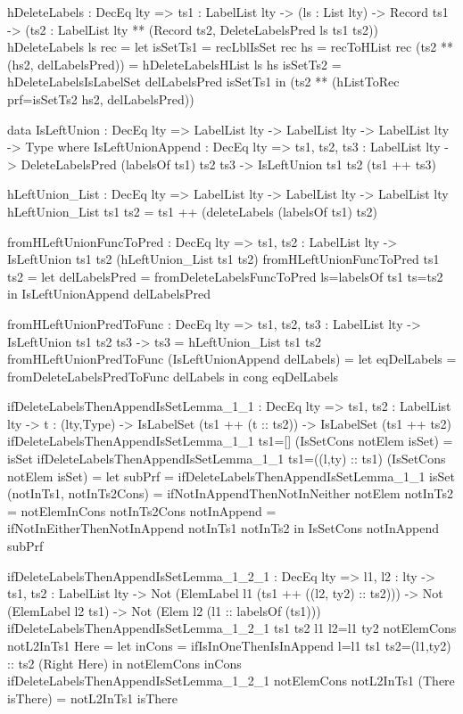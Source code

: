 \begin{code}
hDeleteLabels : DecEq lty => {ts1 : LabelList lty} -> 
  (ls : List lty) -> Record ts1 ->
  (ts2 : LabelList lty ** (Record ts2, DeleteLabelsPred ls ts1 ts2))
hDeleteLabels ls rec =
  let
    isSetTs1 = recLblIsSet rec
    hs = recToHList rec
    (ts2 ** (hs2, delLabelsPred)) = hDeleteLabelsHList ls hs
    isSetTs2 = hDeleteLabelsIsLabelSet delLabelsPred isSetTs1
  in
    (ts2 ** (hListToRec {prf=isSetTs2} hs2, delLabelsPred))

data IsLeftUnion : DecEq lty => LabelList lty -> 
  LabelList lty -> LabelList lty -> Type where
  IsLeftUnionAppend : DecEq lty => 
    {ts1, ts2, ts3 : LabelList lty} -> 
    DeleteLabelsPred (labelsOf ts1) ts2 ts3 -> 
    IsLeftUnion ts1 ts2 (ts1 ++ ts3)
    
hLeftUnion_List : DecEq lty => LabelList lty -> 
  LabelList lty -> LabelList lty
hLeftUnion_List ts1 ts2 = ts1 ++ (deleteLabels (labelsOf ts1) ts2)

fromHLeftUnionFuncToPred : DecEq lty => 
  {ts1, ts2 : LabelList lty} -> 
  IsLeftUnion ts1 ts2 (hLeftUnion_List ts1 ts2)    
fromHLeftUnionFuncToPred {ts1} {ts2} = 
  let delLabelsPred = 
        fromDeleteLabelsFuncToPred {ls=labelsOf ts1} {ts=ts2}
  in IsLeftUnionAppend delLabelsPred
  
fromHLeftUnionPredToFunc : DecEq lty => 
  {ts1, ts2, ts3 : LabelList lty} -> IsLeftUnion ts1 ts2 ts3 ->
  ts3 = hLeftUnion_List ts1 ts2
fromHLeftUnionPredToFunc (IsLeftUnionAppend delLabels) =
  let eqDelLabels = fromDeleteLabelsPredToFunc delLabels
  in cong eqDelLabels
  
ifDeleteLabelsThenAppendIsSetLemma_1_1 : DecEq lty => 
  {ts1, ts2 : LabelList lty} -> {t : (lty,Type)} ->
  IsLabelSet (ts1 ++ (t :: ts2)) -> IsLabelSet (ts1 ++ ts2)
ifDeleteLabelsThenAppendIsSetLemma_1_1 {ts1=[]} 
  (IsSetCons notElem isSet) = isSet
ifDeleteLabelsThenAppendIsSetLemma_1_1 {ts1=((l,ty) :: ts1)} 
  (IsSetCons notElem isSet) = 
  let subPrf = ifDeleteLabelsThenAppendIsSetLemma_1_1 isSet
      (notInTs1, notInTs2Cons) = 
        ifNotInAppendThenNotInNeither notElem
      notInTs2 = notElemInCons notInTs2Cons
      notInAppend = ifNotInEitherThenNotInAppend notInTs1 notInTs2
  in IsSetCons notInAppend subPrf

ifDeleteLabelsThenAppendIsSetLemma_1_2_1 : DecEq lty => 
  {l1, l2 : lty} -> {ts1, ts2 : LabelList lty} -> 
  Not (ElemLabel l1 (ts1 ++ ((l2, ty2) :: ts2))) -> 
  Not (ElemLabel l2 ts1) -> Not (Elem l2 (l1 :: labelsOf (ts1)))
ifDeleteLabelsThenAppendIsSetLemma_1_2_1 {ts1} {ts2} {l1} {l2=l1} 
  {ty2} notElemCons notL2InTs1 Here =
  let inCons = 
        ifIsInOneThenIsInAppend {l=l1} {ts1} {ts2=(l1,ty2) :: ts2} 
          (Right Here)
  in notElemCons inCons
ifDeleteLabelsThenAppendIsSetLemma_1_2_1 notElemCons notL2InTs1 
  (There isThere) = notL2InTs1 isThere


\end{code}
